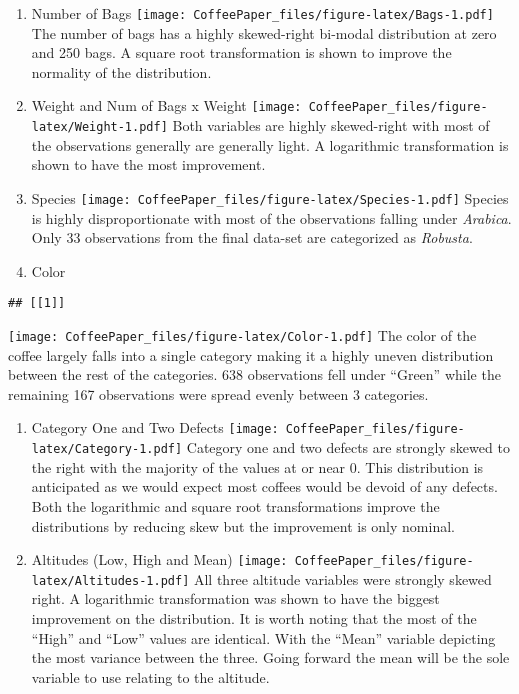 \documentclass[
  12pt,
  english,
  man]{apa6}
\begin{document}
\begin{enumerate}
\def\labelenumi{\arabic{enumi}.}
\item
  Number of Bags
  \texttt{[image: CoffeePaper\_files/figure-latex/Bags-1.pdf]}
  The number of bags has a highly skewed-right bi-modal distribution at zero and 250 bags. A square root transformation is shown to improve the normality of the distribution.
\item
  Weight and Num of Bags x Weight
  \texttt{[image: CoffeePaper\_files/figure-latex/Weight-1.pdf]}
  Both variables are highly skewed-right with most of the observations generally are generally light. A logarithmic transformation is shown to have the most improvement.
\item
  Species
  \texttt{[image: CoffeePaper\_files/figure-latex/Species-1.pdf]}
  Species is highly disproportionate with most of the observations falling under \emph{Arabica}. Only 33 observations from the final data-set are categorized as \emph{Robusta}.
\item
  Color
\end{enumerate}

\begin{verbatim}
## [[1]]
\end{verbatim}

\texttt{[image: CoffeePaper\_files/figure-latex/Color-1.pdf]}
The color of the coffee largely falls into a single category making it a highly uneven distribution between the rest of the categories. 638 observations fell under \enquote{Green} while the remaining 167 observations were spread evenly between 3 categories.

\begin{enumerate}
\def\labelenumi{\arabic{enumi}.}
\setcounter{enumi}{4}
\item
  Category One and Two Defects
  \texttt{[image: CoffeePaper\_files/figure-latex/Category-1.pdf]}
  Category one and two defects are strongly skewed to the right with the majority of the values at or near 0. This distribution is anticipated as we would expect most coffees would be devoid of any defects. Both the logarithmic and square root transformations improve the distributions by reducing skew but the improvement is only nominal.
\item
  Altitudes (Low, High and Mean)
  \texttt{[image: CoffeePaper\_files/figure-latex/Altitudes-1.pdf]}
  All three altitude variables were strongly skewed right. A logarithmic transformation was shown to have the biggest improvement on the distribution. It is worth noting that the most of the \enquote{High} and \enquote{Low} values are identical. With the \enquote{Mean} variable depicting the most variance between the three. Going forward the mean will be the sole variable to use relating to the altitude.
  ~
\end{enumerate}
\end{document}
